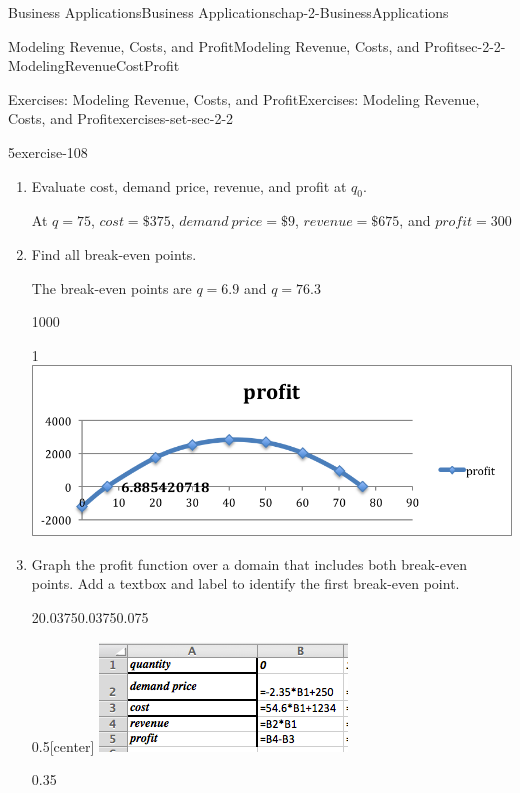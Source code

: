 \documentclass[oneside,10pt,]{book}
\numberwithin{equation}{section}
\begin{document}
\begin{chapterptx}{Business Applications}{}{Business Applications}{}{}{chap-2-BusinessApplications}
\begin{sectionptx}{Modeling Revenue, Costs, and Profit}{}{Modeling Revenue, Costs, and Profit}{}{}{sec-2-2-ModelingRevenueCostProfit}
\begin{exercises-subsection-numberless}{Exercises: Modeling Revenue, Costs, and Profit}{}{Exercises: Modeling Revenue, Costs, and Profit}{}{}{exercises-set-sec-2-2}
\begin{exercisegroup}
\begin{divisionexerciseeg}{5}{}{}{exercise-108}
\begin{enumerate}[label=(\alph*)]
\item\hypertarget{li-208}{}\hypertarget{p-718}{}%
Evaluate cost, demand price, revenue, and profit at \(q_0\).%
\par
\hypertarget{p-719}{}%
At \(q =75\), \(cost =\$375\), \(demand\  price = \$9\), \(revenue = \$675\), and \(profit = 300\)%
\item\hypertarget{li-209}{}\hypertarget{p-720}{}%
Find all break-even points.%
\par
\hypertarget{p-721}{}%
The break-even points are \(q = 6.9\) and \(q = 76.3\)%
\begin{sidebyside}{1}{0}{0}{0}%
\begin{sbspanel}{1}%
\includegraphics[width=1\linewidth]{images/sec2-2-sol3d.png}
\end{sbspanel}%
\end{sidebyside}%
\item\hypertarget{li-210}{}\hypertarget{p-722}{}%
Graph the profit function over a domain that includes both break-even points.  Add a textbox and label to identify the first break-even point.%
\par
\hypertarget{p-723}{}%
%
\begin{sidebyside}{2}{0.0375}{0.0375}{0.075}%
\begin{sbspanel}{0.5}[center]%
\includegraphics[width=1\linewidth]{images/sec2-2-sol3a.png}
\end{sbspanel}%
\begin{sbspanel}{0.35}%
\hypertarget{p-724}{}%

\end{sbspanel}
\end{sidebyside}
\end{enumerate}
\end{divisionexerciseeg}
\end{exercisegroup}
\end{exercises-subsection-numberless}
\end{sectionptx}
\end{chapterptx}
\end{document}

